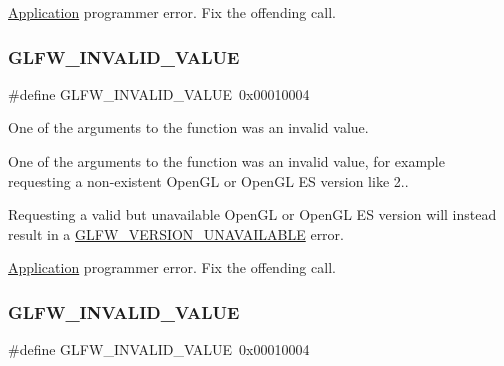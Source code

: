 \hyperlink{classApplication}{Application} programmer error. Fix the offending call. \mbox{\label{group__errors_gaaf2ef9aa8202c2b82ac2d921e554c687}} 
\subsubsection{\texorpdfstring{G\+L\+F\+W\+\_\+\+I\+N\+V\+A\+L\+I\+D\+\_\+\+V\+A\+L\+UE}{GLFW\_INVALID\_VALUE}\hspace{0.1cm}{\footnotesize\ttfamily [4/5]}}
{\footnotesize\ttfamily \#define G\+L\+F\+W\+\_\+\+I\+N\+V\+A\+L\+I\+D\+\_\+\+V\+A\+L\+UE~0x00010004}



One of the arguments to the function was an invalid value. 

One of the arguments to the function was an invalid value, for example requesting a non-\/existent Open\+GL or Open\+GL ES version like 2..

Requesting a valid but unavailable Open\+GL or Open\+GL ES version will instead result in a \hyperlink{group__errors_gad16c5565b4a69f9c2a9ac2c0dbc89462}{G\+L\+F\+W\+\_\+\+V\+E\+R\+S\+I\+O\+N\+\_\+\+U\+N\+A\+V\+A\+I\+L\+A\+B\+LE} error.

\hyperlink{classApplication}{Application} programmer error. Fix the offending call. \mbox{\label{group__errors_gaaf2ef9aa8202c2b82ac2d921e554c687}} 
\subsubsection{\texorpdfstring{G\+L\+F\+W\+\_\+\+I\+N\+V\+A\+L\+I\+D\+\_\+\+V\+A\+L\+UE}{GLFW\_INVALID\_VALUE}\hspace{0.1cm}{\footnotesize\ttfamily [5/5]}}
{\footnotesize\ttfamily \#define G\+L\+F\+W\+\_\+\+I\+N\+V\+A\+L\+I\+D\+\_\+\+V\+A\+L\+UE~0x00010004}



